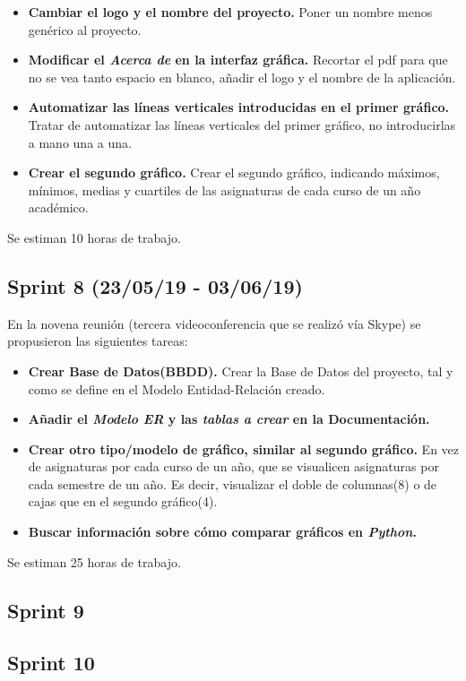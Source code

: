\begin{itemize}
\item
\textbf{Cambiar el logo y el nombre del proyecto.} Poner un nombre menos genérico al proyecto.
\item
\textbf{Modificar el \emph{Acerca de} en la interfaz gráfica.} Recortar el pdf para que no se vea tanto espacio en blanco, añadir el logo y el nombre de la aplicación.
\item
\textbf{Automatizar las líneas verticales introducidas en el primer gráfico.} Tratar de automatizar las líneas verticales del primer gráfico, no introducirlas a mano una a una.
\item
\textbf{Crear el segundo gráfico.} Crear el segundo gráfico, indicando máximos, mínimos, medias y cuartiles de las asignaturas de cada curso de un año académico.
\end{itemize}

Se estiman 10 horas de trabajo.

\subsection{Sprint 8 (23/05/19 - 03/06/19)}
En la novena reunión (tercera videoconferencia que se realizó vía Skype) se propusieron las siguientes tareas:

\begin{itemize}
\item
\textbf{Crear Base de Datos(BBDD).} Crear la Base de Datos del proyecto, tal y como se define en el Modelo Entidad-Relación creado.
\item
\textbf{Añadir el \emph{Modelo ER} y las \emph{tablas a crear} en la Documentación.}
\item
\textbf{Crear otro tipo/modelo de gráfico, similar al segundo gráfico.} En vez de asignaturas por cada curso de un año, que se visualicen asignaturas por cada semestre de un año. Es decir, visualizar el doble de columnas(8) o de cajas que en el segundo gráfico(4).
\item
\textbf{Buscar información sobre cómo comparar gráficos en \emph{Python}.}
\end{itemize}

Se estiman 25 horas de trabajo.

\subsection{Sprint 9}
\subsection{Sprint 10}

